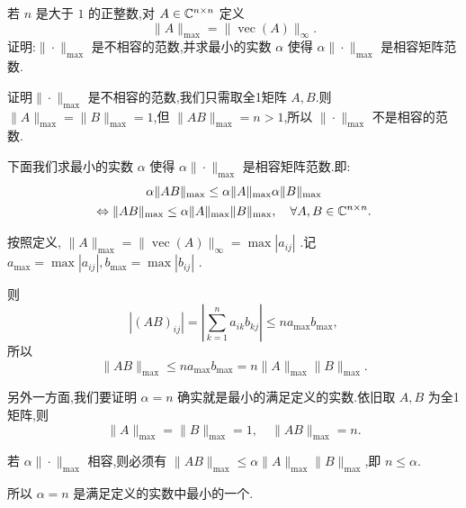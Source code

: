 \begin{problem}
若 $n$ 是大于 $1$ 的正整数,对 $A\in\mathbb{C}^{n\times n}$ 定义
\[
    \|A\|_{\max}=\|\operatorname{vec}(A)\|_{\infty}.
\]
证明:$\|\cdot\|_{\max}$ 是不相容的范数,并求最小的实数 $\alpha$ 使得 $\alpha\|\cdot\|_{\max}$ 是相容矩阵范数.
\begin{solution}
    证明$\|\cdot\|_{\max}$ 是不相容的范数,我们只需取全1矩阵 $A,B$.则 $\|A\|_{\max}=\|B\|_{\max}=1$,但 $\|AB\|_{\max}=n>1$,所以 $\|\cdot\|_{\max}$ 不是相容的范数.

    下面我们求最小的实数 $\alpha$ 使得 $\alpha\|\cdot\|_{\max}$ 是相容矩阵范数.即:
    \begin{gather*}
        \alpha\|AB\|_{\max} \le \alpha\|A\|_{\max}\alpha\|B\|_{\max} \\
        \Leftrightarrow \|AB\|_{\max} \le \alpha\|A\|_{\max}\|B\|_{\max}, \quad \forall A,B\in\mathbb{C}^{n\times n}.
    \end{gather*}

    按照定义, $\|A\|_{\max}=\|\operatorname{vec}(A)\|_{\infty} = \max{|a_{ij}|}$ .记 $a_{\max} = \max{|a_{ij}|},b_{\max} = \max{|b_{ij}|}$ .

    则
    \[
        |(AB)_{ij}| = |\sum_{k=1}^{n}a_{ik}b_{kj}| \le n a_{\max} b_{\max},
    \]所以
    \[
        \|AB\|_{\max} \le n a_{\max} b_{\max} = n \|A\|_{\max} \|B\|_{\max}.
    \]

    另外一方面,我们要证明 $\alpha = n$ 确实就是最小的满足定义的实数.依旧取 $A,B$ 为全1矩阵,则
    \[
        \|A\|_{\max}=\|B\|_{\max}=1, \quad \|AB\|_{\max}=n.
    \]

    若 $\alpha\|\cdot\|_{\max}$ 相容,则必须有 $\|AB\|_{\max} \le \alpha\|A\|_{\max}\|B\|_{\max}$,即 $n \le \alpha$.
    
    所以 $\alpha = n$ 是满足定义的实数中最小的一个.
\end{solution}
\end{problem}

